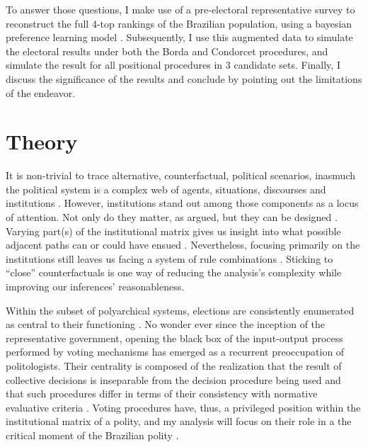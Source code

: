 \documentclass[hidelinks,11pt]{article}
\begin{document}
To answer those questions, I make use of a pre-electoral representative survey
to reconstruct the full 4-top rankings of the Brazilian population, using a
bayesian preference learning model \parencite{sorensen2019bayesmallows}.
Subsequently, I use this augmented data to simulate the electoral results under
both the Borda and Condorcet procedures, and simulate the result for all
positional procedures in 3 candidate sets. Finally, I discuss the significance
of the results and conclude by pointing out the limitations of the endeavor.

\section{Theory}\label{sec2}

It is non-trivial to trace alternative, counterfactual, political scenarios,
inasmuch the political system is a complex web of agents, situations, discourses
and institutions \parencite{bednar2018modeling, simon1991architecture,
  parsons1949structure, ostrom1997meaning}. However,
institutions stand out among those components as a locus of attention. Not only do they matter, as
\textcite{north1991institutions} argued, but they can be designed
\parencite{coleman1990rational}. Varying part(s) of the institutional matrix
gives us insight into what possible adjacent paths can or could have ensued
\parencite{north2018institutional}. Nevertheless, focusing primarily on the
institutions still leaves us facing a system of rule combinations
\parencite{ostrom1986agenda}. Sticking to ``close'' counterfactuals
\parencite{sep-possible-worlds, king2006dangers} is one way of reducing the
analysis's complexity while improving our inferences' reasonableness.

Within the subset of polyarchical systems, elections are consistently enumerated
as central to their functioning \parencite{riker1982liberalism}. No wonder ever
since the inception of the representative government, opening the black box of
the input-output process performed by voting mechanisms has emerged as a
recurrent preoccupation of politologists\parencite{rothschild2005axiom,mclean14_stran_histor_social_choic_contr}. Their centrality is composed of the realization that the result of collective decisions is inseparable from the
decision procedure being used and that such procedures differ in terms of their
consistency with normative evaluative criteria \parencite{saari2001chaotic,
  Sen_2012}. Voting procedures have, thus, a privileged position within the
institutional matrix of a polity, and my analysis will focus on their role in a
the critical moment of the Brazilian polity \parencite{kaminski1998revival,
  kaminski1999communism, tabarrok1999would}.
\end{document}
